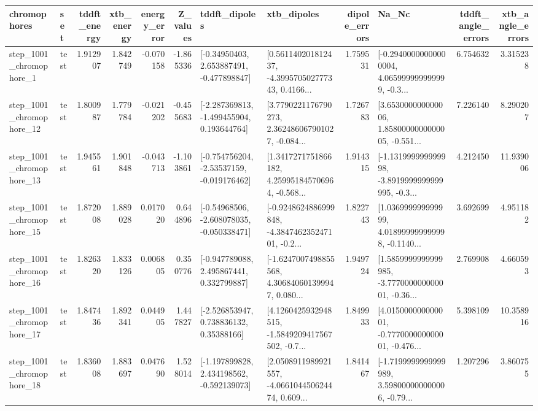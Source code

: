 \begin{tabular}{llrrrrllrlrr}
\toprule
             chromophores &       set &  tddft\_energy &  xtb\_energy &  energy\_error &  Z\_values &                               tddft\_dipoles &                                        xtb\_dipoles &  dipole\_errors &                                              Na\_Nc &  tddft\_angle\_errors &  xtb\_angle\_errors \\
\midrule
  step\_1001\_chromophore\_1 &      test &      1.912907 &    1.842749 &     -0.070158 & -1.865336 &    [-0.34950403, 2.653887491, -0.477898847] &  [0.561140201812437, -4.399570502777343, 0.4166... &       1.759531 &  [-0.29400000000000004, 4.065999999999999, -0.3... &            6.754632 &          3.315238 \\
 step\_1001\_chromophore\_12 &      test &      1.800987 &    1.779784 &     -0.021202 & -0.455683 &   [-2.287369813, -1.499455904, 0.193644764] &  [3.7790221176790273, 2.362486067901027, -0.084... &       1.726783 &  [3.653000000000006, 1.8580000000000005, -0.551... &            7.226140 &          8.290207 \\
 step\_1001\_chromophore\_13 &      test &      1.945561 &    1.901848 &     -0.043713 & -1.103861 &   [-0.754756204, -2.53537159, -0.019176462] &  [1.3417271751866182, 4.259951845706964, -0.568... &       1.914315 &  [-1.131999999999998, -3.8919999999999995, -0.3... &            4.212450 &         11.939006 \\
 step\_1001\_chromophore\_15 &      test &      1.872008 &    1.889028 &      0.017020 &  0.644896 &   [-0.54968506, -2.608078035, -0.050338471] &  [-0.9248624886999848, -4.384746235247101, -0.2... &       1.822743 &  [1.036999999999999, 4.018999999999998, -0.1140... &            3.692699 &          4.951182 \\
 step\_1001\_chromophore\_16 &      test &      1.826320 &    1.833126 &      0.006805 &  0.350776 &    [-0.947789088, 2.495867441, 0.332799887] &  [-1.6247007498855568, 4.306840601399947, 0.080... &       1.949724 &  [1.5859999999999985, -3.777000000000001, -0.36... &            2.769908 &          4.660593 \\
 step\_1001\_chromophore\_17 &      test &      1.847436 &    1.892341 &      0.044905 &  1.447827 &     [-2.526853947, 0.738836132, 0.35388166] &  [4.1260425932948515, -1.5849209417567502, -0.7... &       1.849933 &  [4.015000000000001, -0.777000000000001, -0.476... &            5.398109 &         10.358916 \\
 step\_1001\_chromophore\_18 &      test &      1.836008 &    1.883697 &      0.047690 &  1.528014 &   [-1.197899828, 2.434198562, -0.592139073] &  [2.0508911989921557, -4.066104450624474, 0.609... &       1.841467 &  [-1.7199999999999989, 3.598000000000006, -0.79... &            1.207296 &          3.860755 \\

\end{tabular}
